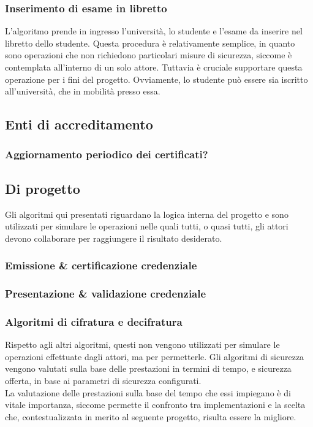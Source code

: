 \documentclass[a4paper,12pt]{article}
\begin{document}
\subsubsection{Inserimento di esame in libretto}
L'algoritmo prende in ingresso l'università, lo studente e l'esame da inserire nel libretto dello studente. Questa procedura è relativamente semplice, in quanto sono operazioni che non richiedono particolari misure di sicurezza, siccome è contemplata all'interno di un solo attore. Tuttavia è cruciale supportare questa operazione per i fini del progetto. Ovviamente, lo studente può essere sia iscritto all'università, che in mobilità presso essa.
\subsection{Enti di accreditamento}
\subsubsection{Aggiornamento periodico dei certificati?}
\subsection{Di progetto}
Gli algoritmi qui presentati riguardano la logica interna del progetto e sono utilizzati per simulare le operazioni nelle quali tutti, o quasi tutti, gli attori devono collaborare per raggiungere il risultato desiderato. 
\subsubsection{Emissione \& certificazione credenziale}
\subsubsection{Presentazione \& validazione credenziale}
\subsubsection{Algoritmi di cifratura e decifratura}
Rispetto agli altri algoritmi, questi non vengono utilizzati per simulare le operazioni effettuate dagli attori, ma per permetterle. Gli algoritmi di sicurezza vengono valutati sulla base delle prestazioni in termini di tempo, e sicurezza offerta, in base ai parametri di sicurezza configurati.
\\[1em]
La valutazione delle prestazioni sulla base del tempo che essi impiegano è di vitale importanza, siccome permette il confronto tra implementazioni e la scelta che, contestualizzata in merito al seguente progetto, risulta essere la migliore.
\end{document}
